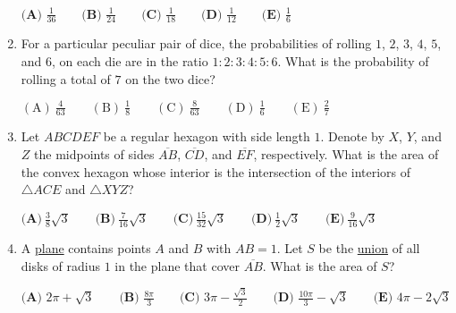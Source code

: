\documentclass{article}%
\begin{document}
\begin{enumerate}
$\textbf{(A) } \frac{1}{36} \qquad \textbf{(B) } \frac{1}{24} \qquad \textbf{(C) } \frac{1}{18} \qquad \textbf{(D) } \frac{1}{12} \qquad \textbf{(E) } \frac{1}{6}$

%
\item%
For a particular peculiar pair of dice, the probabilities of rolling $1$, $2$, $3$, $4$, $5$, and $6$, on each die are in the ratio $1:2:3:4:5:6$. What is the probability of rolling a total of $7$ on the two dice? 

$\mathrm{(A) \ } \frac{4}{63}\qquad \mathrm{(B) \ } \frac{1}{8}\qquad \mathrm{(C) \ } \frac{8}{63}\qquad \mathrm{(D) \ } \frac{1}{6}\qquad \mathrm{(E) \ } \frac{2}{7}$



%
\item%
Let $ABCDEF$ be a regular hexagon with side length $1$. Denote by $X$, $Y$, and $Z$ the midpoints of sides $\overline {AB}$, $\overline{CD}$, and $\overline{EF}$, respectively. What is the area of the convex hexagon whose interior is the intersection of the interiors of $\triangle ACE$ and $\triangle XYZ$?

$\textbf{(A)}\ \frac {3}{8}\sqrt{3} \qquad \textbf{(B)}\ \frac {7}{16}\sqrt{3} \qquad \textbf{(C)}\ \frac {15}{32}\sqrt{3} \qquad  \textbf{(D)}\ \frac {1}{2}\sqrt{3} \qquad \textbf{(E)}\ \frac {9}{16}\sqrt{3}$

%
\item%
A \href{/wiki/index.php/Plane}{plane} contains points $A$ and $B$ with $AB = 1$. Let $S$ be the \href{/wiki/index.php/Union}{union} of all disks of radius $1$ in the plane that cover $\overline{AB}$. What is the area of $S$?

$\textbf {(A) } 2\pi + \sqrt3 \qquad \textbf {(B) } \frac {8\pi}{3} \qquad \textbf {(C) } 3\pi - \frac {\sqrt3}{2} \qquad \textbf {(D) } \frac {10\pi}{3} - \sqrt3 \qquad \textbf {(E) }4\pi - 2\sqrt3$

%
\end{enumerate}

%
\end{document}
